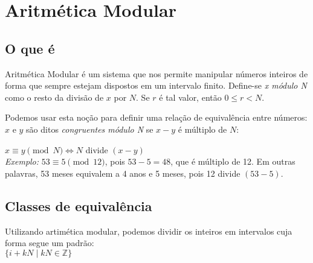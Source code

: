 \section{Aritmética Modular}
\vspace{1.5em}

\subsection{O que é}

Aritmética Modular é um sistema que nos permite manipular números inteiros de
forma que sempre estejam dispostos em um intervalo finito.
Define-se \textit{x módulo N} como o resto da divisão de $x$ por $N$. Se $r$ é
tal valor, então $0 \leq r < N$.

Podemos usar esta noção para definir uma relação de equivalência entre
números: $x$ e $y$ são ditos \textit{congruentes módulo N} se $x-y$ é múltiplo
de $N$:

$x \equiv y \pmod N \iff N$ divide $(x-y)$
\\

\textit{Exemplo:}
$53 \equiv 5 \pmod{12}$, pois $53-5 = 48$, que é múltiplo de 12. Em outras
palavras, 53 meses equivalem a 4 anos e 5 meses, pois 12 divide $(53-5)$.

\vspace{1.5em}
\subsection{Classes de equivalência}

Utilizando artimética modular, podemos dividir os inteiros em intervalos cuja
forma segue um padrão:\\

\quad $\{i + kN \; | \; kN \in \mathbb{Z}\}$
